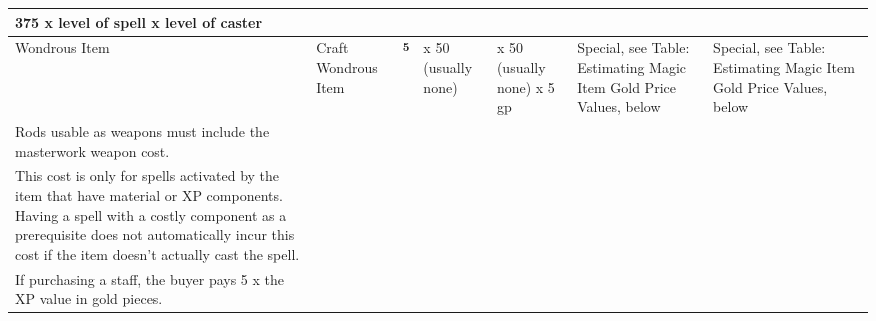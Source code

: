 \begin{longtable}{llllllllllllll}
{\begin{minipage}[t]{1.044in}
375 x level of spell x level of caster\end{minipage}}\\
\hline
\multicolumn{1}{|p{0.472in}|}{\begin{minipage}[t]{0.472in}\centering
Wondrous\linebreak
Item \end{minipage}} & \multicolumn{1}{p{0.639in}|}{\begin{minipage}[t]{0.639in}\raggedright
Craft Wondrous Item \end{minipage}} & \multicolumn{1}{p{0.497in}|}{\begin{minipage}[t]{0.497in}\centering
\textsuperscript{\textbf{5 }}\end{minipage}} & \multicolumn{1}{p{0.564in}|}{\begin{minipage}[t]{0.564in}\centering
x 50 (usually none)\end{minipage}} & \multicolumn{1}{p{0.544in}|}{\begin{minipage}[t]{0.544in}\raggedright
x 50 (usually none)\linebreak
x 5 gp\end{minipage}} & \multicolumn{1}{p{0.739in}|}{\begin{minipage}[t]{0.739in}\raggedright
Special, see Table: Estimating Magic Item Gold Price Values, below\end{minipage}} & \multicolumn{8}{p{1.044in}|}{\begin{minipage}[t]{1.044in}\raggedright
Special, see Table: Estimating Magic Item Gold Price Values, below\end{minipage}}\\
\hline
\multicolumn{1}{|p{0.472in}|}{\begin{minipage}[t]{0.472in}\centering
1 Rods usable as weapons must include the masterwork weapon cost.\end{minipage}}\\
\hline
\multicolumn{1}{p{0.639in}|}{\begin{minipage}[t]{0.639in}\centering
2 This cost is only for spells activated by the item that have material or XP components. 
Having a spell with a costly component as a prerequisite does not automatically 
incur this cost if the item doesn't actually cast the spell. \end{minipage}}\\
\hline
\multicolumn{1}{p{0.497in}|}{\begin{minipage}[t]{0.497in}\centering
3 If purchasing a staff, the buyer pays 5 x the XP value in gold pieces.\end{minipage}}\\

\end{longtable}
